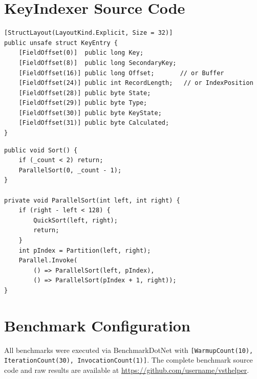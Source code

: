 \documentclass[conference]{IEEEtran}
\begin{document}
\section{KeyIndexer Source Code}
\label{app:implementation}

\begin{verbatim}
[StructLayout(LayoutKind.Explicit, Size = 32)]
public unsafe struct KeyEntry {
    [FieldOffset(0)]  public long Key;
    [FieldOffset(8)]  public long SecondaryKey;
    [FieldOffset(16)] public long Offset;       // or Buffer
    [FieldOffset(24)] public int RecordLength;   // or IndexPosition
    [FieldOffset(28)] public byte State;
    [FieldOffset(29)] public byte Type;
    [FieldOffset(30)] public byte KeyState;
    [FieldOffset(31)] public byte Calculated;
}
\end{verbatim}

\begin{verbatim}
public void Sort() {
    if (_count < 2) return;
    ParallelSort(0, _count - 1);
}

private void ParallelSort(int left, int right) {
    if (right - left < 128) {
        QuickSort(left, right);
        return;
    }
    int pIndex = Partition(left, right);
    Parallel.Invoke(
        () => ParallelSort(left, pIndex),
        () => ParallelSort(pIndex + 1, right));
}
\end{verbatim}

\section{Benchmark Configuration}
\label{app:benchmark}

All benchmarks were executed via BenchmarkDotNet with \texttt{[WarmupCount(10), IterationCount(30), InvocationCount(1)]}. The complete benchmark source code and raw results are available at \url{https://github.com/username/vsthelper}.
\end{document}
